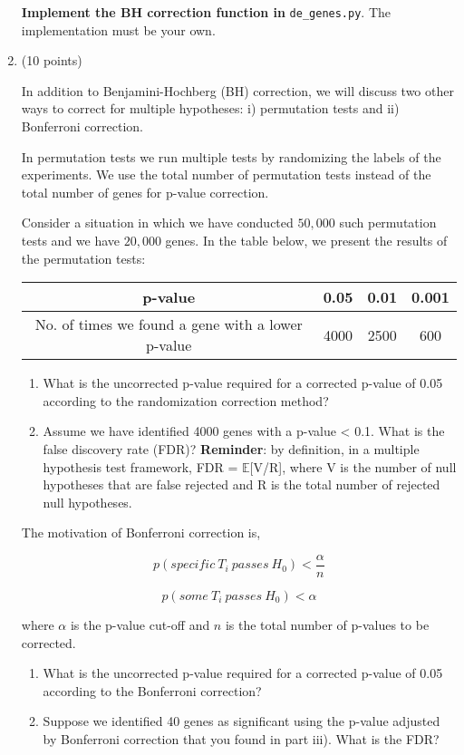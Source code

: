 \begin{enumerate}
\textbf{Implement the BH correction function in }\texttt{de\_genes.py}. The implementation must be your own.\\

\item (10 points) 

In addition to Benjamini-Hochberg (BH) correction, we will discuss two other ways to correct for multiple hypotheses: i) permutation tests and ii) Bonferroni correction.

In permutation tests we run multiple tests by randomizing the labels of the experiments.  We use the total number of permutation tests instead of the total number of genes for p-value correction.

Consider a situation in which we have conducted $50,000$ such permutation tests and we have $20,000$ genes. In the table below, we present the results of the permutation tests:

\begin{tabular}{|c|c|c|c|}
\hline
p-value& 0.05&0.01&0.001\\
\hline
No. of times we found a gene with a lower p-value& 4000 & 2500 & 600\\
\hline
\end{tabular}

\begin{enumerate}
\item What is the uncorrected p-value required for a corrected p-value of 0.05 according to the randomization correction method?

\item Assume we have identified 4000 genes with a p-value < 0.1. What is the false discovery rate (FDR)? \textbf{Reminder}: by definition, in a multiple hypothesis test framework, FDR = $\mathbb{E}$[V/R], where V is the number of null hypotheses that are false rejected and R is the total number of rejected null hypotheses.
\end{enumerate}
\begin{solution}
\end{solution}

The motivation of Bonferroni correction is,

$$p(specific\: T_i\: passes\: H_0)<\frac{\alpha}{n}$$

$$p(some\: T_i\: passes\: H_0)<\alpha$$

where $\alpha$ is the p-value cut-off and $n$ is the total number of p-values to be corrected.

\begin{enumerate}[resume]
\item What is the uncorrected p-value required for a corrected p-value of 0.05 according to the Bonferroni correction?

\item Suppose we identified 40 genes as significant using the p-value adjusted by Bonferroni correction that you found in part iii). What is the FDR?
\end{enumerate}

\begin{solution}
\end{solution}
\end{enumerate}


